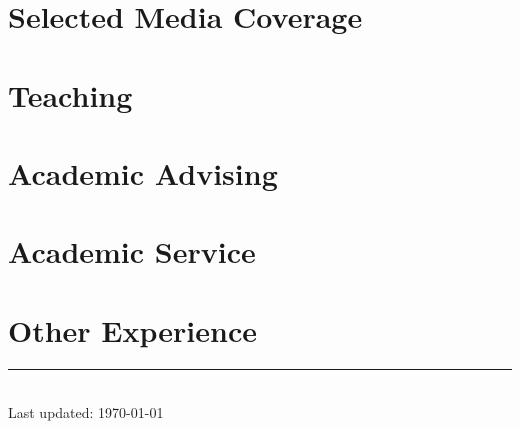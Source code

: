 \documentclass[11pt]{article} %
\begin{document}
\section*{Selected Media Coverage}
\label{media}


\section*{Teaching}
\label{teaching}



\section*{Academic Advising}
\label{advising}



\section*{Academic Service}
\label{service}



\section*{Other Experience}
\label{exp_other}



\centering
\rule{0.25\linewidth}{0.4pt}\\
\medskip
Last updated: \today
\end{document}
